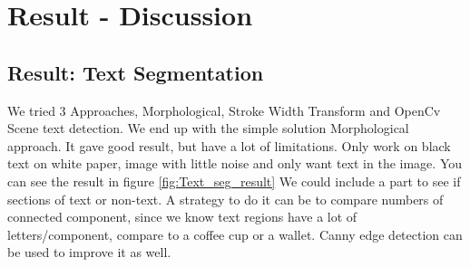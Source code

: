 \documentclass[Report.tex]{subfiles}
\begin{document}
\chapter{Result - Discussion}
\label{chap:Result - Discussion}
\section{Result: Text Segmentation}
We tried 3 Approaches, Morphological, Stroke Width Transform and OpenCv Scene text detection. We end up with the simple solution Morphological approach. It gave good result, but have a lot of limitations. Only work on black text on white paper, image with little noise and only want text in the image. You can see the result in figure \ref{fig:Text_seg_result} We could include a part to see if sections of text or non-text. A strategy to do it can be to compare  numbers of connected component, since we know text regions have a lot of letters/component, compare to a coffee cup or a wallet. Canny edge detection can be used to improve it as well.
\end{document}
